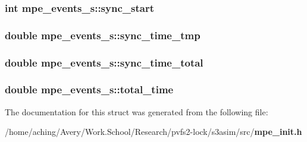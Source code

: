 \subsubsection{\setlength{\rightskip}{0pt plus 5cm}int \bf{mpe\_\-events\_\-s::sync\_\-start}}\label{structmpe__events__s_459c4ffa2f55d4a1d7b9c91c9866c0c1}


\subsubsection{\setlength{\rightskip}{0pt plus 5cm}double \bf{mpe\_\-events\_\-s::sync\_\-time\_\-tmp}}\label{structmpe__events__s_a0bbe3afd19e63349bea6c88be772087}


\subsubsection{\setlength{\rightskip}{0pt plus 5cm}double \bf{mpe\_\-events\_\-s::sync\_\-time\_\-total}}\label{structmpe__events__s_9ab83fae257e239dc0bd0af4fc2d77ec}


\subsubsection{\setlength{\rightskip}{0pt plus 5cm}double \bf{mpe\_\-events\_\-s::total\_\-time}}\label{structmpe__events__s_fdb009783b723907ae2e73e177657419}




The documentation for this struct was generated from the following file:\begin{CompactItemize}
\item 
/home/aching/Avery/Work.School/Research/pvfs2-lock/s3asim/src/\bf{mpe\_\-init.h}\end{CompactItemize}
